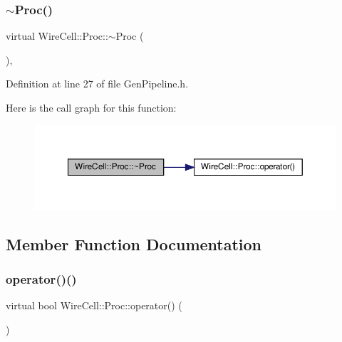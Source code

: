 \subsubsection{\texorpdfstring{$\sim$\+Proc()}{~Proc()}}
{\footnotesize\ttfamily virtual Wire\+Cell\+::\+Proc\+::$\sim$\+Proc (\begin{DoxyParamCaption}{ }\end{DoxyParamCaption})\hspace{0.3cm}{\ttfamily [inline]}, {\ttfamily [virtual]}}



Definition at line 27 of file Gen\+Pipeline.\+h.

Here is the call graph for this function\+:
\nopagebreak
\begin{figure}[H]
\begin{center}
\leavevmode
\includegraphics[width=350pt]{class_wire_cell_1_1_proc_adde4eefd1b4566b2b40dee1a38c1b609_cgraph}
\end{center}
\end{figure}


\subsection{Member Function Documentation}
\mbox{\label{class_wire_cell_1_1_proc_a9c642ed1f6b6741633c6cb1bd063b502}} 
\subsubsection{\texorpdfstring{operator()()}{operator()()}}
{\footnotesize\ttfamily virtual bool Wire\+Cell\+::\+Proc\+::operator() (\begin{DoxyParamCaption}{ }\end{DoxyParamCaption})\hspace{0.3cm}{\ttfamily [pure virtual]}}



